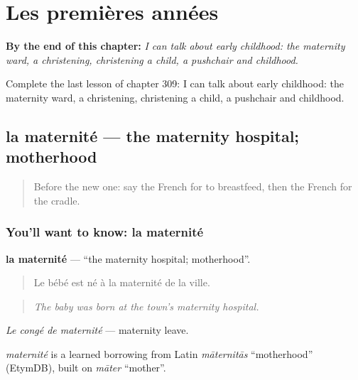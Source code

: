 
\chapter{Les premières années}
\label{ch:fr-les-premieres-annees}

\begin{chapteropening}
\textbf{By the end of this chapter:} \emph{I can talk about early childhood: the maternity ward, a christening, christening a child, a pushchair and childhood.}

Complete the last lesson of chapter 309: I can talk about early childhood: the maternity ward, a christening, christening a child, a pushchair and childhood.
\end{chapteropening}

\section[la maternité]{la maternité — the maternity hospital; motherhood}

\label{lesson:FR-C309-maternite}



\begin{quote}
Before the new one: say the French for to breastfeed, then the French for the cradle.
\end{quote}

\subsection*{You'll want to know: la maternité}
\textbf{la maternité} — \textquotedblleft{}the maternity hospital; motherhood\textquotedblright{}.

\begin{quote}
Le bébé est né à la maternité de la ville.
\end{quote}

\begin{quote}
\emph{The baby was born at the town's maternity hospital.}
\end{quote}

\emph{Le congé de maternité} — maternity leave.

\begin{cousinweb}
\emph{maternité} is a learned borrowing from Latin \emph{māternitās} \textquotedblleft{}motherhood\textquotedblright{} (EtymDB), built on \emph{māter} \textquotedblleft{}mother\textquotedblright{}.
\end{cousinweb}

